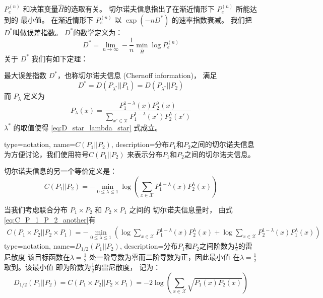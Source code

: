 $P_e^{(n)}$ 和决策变量$\widehat{H}$的选取有关。
切尔诺夫信息指出了在渐近情形下 $P_e^{(n)}$ 所能达到的
最小值。
在渐近情形下 $P_e^{(n)}$ 以 $\exp(-n D^*)$ 的速率指数衰减。
我们把$D^*$叫做误差指数。
$D^*$的数学定义为：
\begin{equation}
 D^* = \lim_{n\to \infty} -\frac{1}{n} \min_{\widehat{H}}
 \log P^{(n)}_e
\end{equation}
关于 $D^*$ 我们有如下定理：
\begin{theorem}
  最大误差指数 $D^*$，也称切尔诺夫信息 (Chernoff information)，
  满足
  \begin{equation}\label{eq:D_star_lambda_star}
    D^* = D(P_{\lambda^*} || P_1) = D(P_{\lambda^*}|| P_2)
  \end{equation}
  而 $P_{\lambda}$ 定义为
  \begin{equation}\label{eq:P_lambda_x}
    P_{\lambda}(x) = \frac{P^{1-\lambda}_1 (x) P^{\lambda}_2 (x)}
    {\sum_{x' \in \mathcal{X}} P^{1-\lambda}_1 (x') P^{\lambda}_2 (x')}
  \end{equation}
  $\lambda^*$ 的取值使得  \eqref{eq:D_star_lambda_star} 式成立。
\end{theorem}

{
  type=notation,
  name={$C(P_1||P_2)$},
  description={分布$P_1$和$P_2$之间的切尔诺夫信息}
}
为方便讨论，我们使用符号$C(P_1||P_2)$
来表示分布$P_1$和$P_2$之间的切尔诺夫信息。

切尔诺夫信息的另一个等价定义是：
\begin{equation}\label{eq:C_P_1_P_2_another}
  C(P_1||P_2) = -\min_{0\leq \lambda \leq 1}
  \log \left(\sum_{x \in \mathcal{X}}
  P^{1-\lambda}_1(x)P^{\lambda}_2(x)
  \right)
\end{equation}

当我们考虑联合分布 $P_1 \times P_2$
和 $P_2 \times P_1$ 之间的  切尔诺夫信息量时，
由式 \eqref{eq:C_P_1_P_2_another}有
\begin{align*}
  C(P_1 \times P_2||P_2 \times P_1) 
  = -\min_{0\leq \lambda \leq 1}
  \left(\log \sum_{x\in \mathcal{X}}
  P_1^{1-\lambda}(x) P_2^{\lambda}(x) 
  +\log \sum_{x\in \mathcal{X}}
  P_2^{1-\lambda}(x) P_1^{\lambda}(x) 
  \right)
  \end{align*}
{
  type=notation,
  name={$D_{1/2}(P_1||P_2)$},
  description={分布$P_1$和$P_2$之间阶数为$\frac{1}{2}$的雷尼散度}
}
该目标函数在$\lambda=\frac{1}{2}$
处一阶导数为零而二阶导数为正，因此最小值
在$\lambda=\frac{1}{2}$取到。该最小值
即为阶数为$\frac{1}{2}$的雷尼散度，
记为：
\begin{equation}\label{eq:renyi_divergence}
  D_{1/2}(P_1 || P_2) = C(P_1 \times P_2||P_2 \times P_1)=
  -2\log \left(\sum_{x \in \mathcal{X}}
  \sqrt{P_1(x)P_2(x)} \right)
\end{equation}


